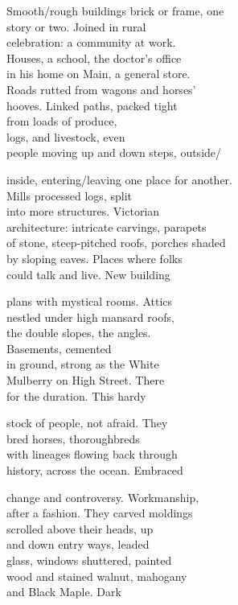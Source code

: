 \documentclass[twoside,10pt]{book}
\begin{document}
Smooth/rough buildings brick or frame, one\\
story or two. Joined in rural\\
celebration: a community at work.\\
Houses, a school, the doctor's office\\
in his home on Main, a general store.\\
Roads rutted from wagons and horses'\\
hooves. Linked paths, packed tight\\
from loads of produce,\\
logs, and livestock, even\\
people moving up and down steps, outside/

inside, entering/leaving one place for another.\\
Mills processed logs, split\\
into more structures. Victorian\\
architecture: intricate carvings, parapets\\
of stone, steep-pitched roofs, porches shaded\\
by sloping eaves. Places where folks\\
could talk and live. New building

plans with mystical rooms. Attics\\
nestled under high mansard roofs,\\
the double slopes, the angles.\\
Basements, cemented\\
in ground, strong as the White\\
Mulberry on High Street. There\\
for the duration. This hardy

stock of people, not afraid. They\\
bred horses, thoroughbreds\\
with lineages flowing back through\\
history, across the ocean. Embraced

change and controversy. Workmanship,\\
after a fashion. They carved moldings\\
scrolled above their heads, up\\
and down entry ways, leaded\\
glass, windows shuttered, painted\\
wood and stained walnut, mahogany\\
and Black Maple. Dark
\end{document}
